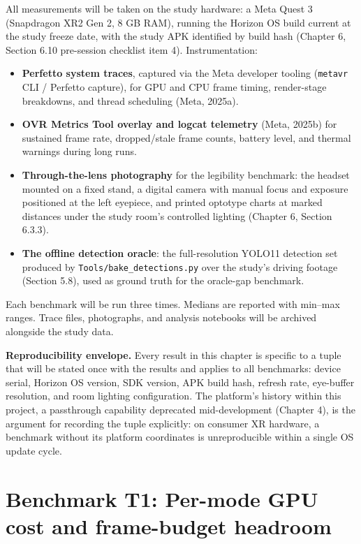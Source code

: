 All measurements will be taken on the study hardware: a Meta Quest 3 (Snapdragon XR2 Gen 2, 8 GB
RAM), running the Horizon OS build current at the study freeze date, with the study APK identified
by build hash (Chapter 6, Section 6.10 pre-session checklist item 4). Instrumentation:

\begin{itemize}
\item \textbf{Perfetto system traces}, captured via the Meta developer tooling (\verb|metavr| CLI / Perfetto
  capture), for GPU and CPU frame timing, render-stage breakdowns, and thread scheduling
  (Meta, 2025a).
\item \textbf{OVR Metrics Tool overlay and logcat telemetry} (Meta, 2025b) for sustained frame rate,
  dropped/stale frame counts, battery level, and thermal warnings during long runs.
\item \textbf{Through-the-lens photography} for the legibility benchmark: the headset mounted on a fixed
  stand, a digital camera with manual focus and exposure positioned at the left eyepiece, and
  printed optotype charts at marked distances under the study room's controlled lighting
  (Chapter 6, Section 6.3.3).
\item \textbf{The offline detection oracle}: the full-resolution YOLO11 detection set produced by
  \verb|Tools/bake_detections.py| over the study's driving footage (Section 5.8), used as ground truth
  for the oracle-gap benchmark.
\end{itemize}

Each benchmark will be run three times. Medians are reported with min–max ranges. Trace files,
photographs, and analysis notebooks will be archived alongside the study data.

\textbf{Reproducibility envelope.} Every result in this chapter is specific to a tuple that will be
stated once with the results and applies to all benchmarks: device serial, Horizon OS version,
SDK version, APK build hash, refresh rate, eye-buffer resolution, and room lighting configuration.
The platform's history within this project, a passthrough capability deprecated mid-development
(Chapter 4), is the argument for recording the tuple explicitly: on consumer XR hardware, a
benchmark without its platform coordinates is unreproducible within a single OS update cycle.

\section{Benchmark T1: Per-mode GPU cost and frame-budget headroom}


